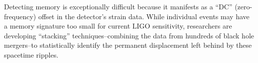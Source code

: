 Detecting memory is exceptionally difficult because it manifests as a ``DC'' (zero-frequency) offset in the detector’s strain data. While individual events may have a memory signature too small for current LIGO sensitivity, researchers are developing ``stacking'' techniques--combining the data from hundreds of black hole mergers--to statistically identify the permanent displacement left behind by these spacetime ripples.
